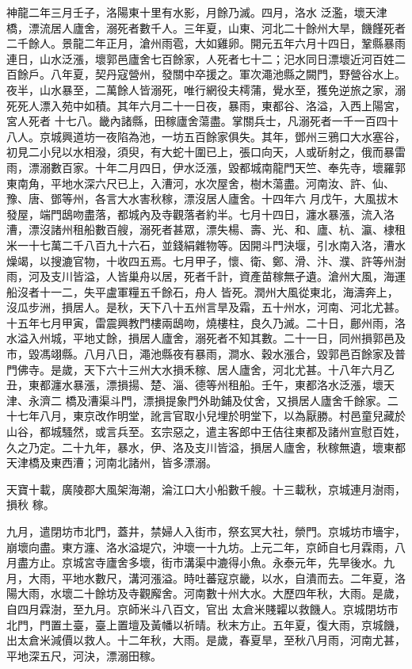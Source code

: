 \begin{pinyinscope}
 神龍二年三月壬子，洛陽東十里有水影，月餘乃滅。四月，洛水
 泛濫，壞天津橋，漂流居人廬舍，溺死者數千人。三年夏，山東、河北二十餘州大旱，饑饉死者二千餘人。景龍二年正月，滄州雨雹，大如雞卵。開元五年六月十四日，鞏縣暴雨連日，山水泛漲，壞郭邑廬舍七百餘家，人死者七十二；汜水同日漂壞近河百姓二百餘戶。八年夏，契丹寇營州，發關中卒援之。軍次澠池縣之闕門，野營谷水上。夜半，山水暴至，二萬餘人皆溺死，唯行網役夫樗蒲，覺水至，獲免逆旅之家，溺死死人漂入苑中如積。其年六月二十一日夜，暴雨，東都谷、洛溢，入西上陽宮，宮人死者
 十七八。畿內諸縣，田稼廬舍蕩盡。掌關兵士，凡溺死者一千一百四十八人。京城興道坊一夜陷為池，一坊五百餘家俱失。其年，鄧州三鴉口大水塞谷，初見二小兒以水相潑，須臾，有大蛇十圍已上，張口向天，人或斫射之，俄而暴雷雨，漂溺數百家。十年二月四日，伊水泛漲，毀都城南龍門天竺、奉先寺，壞羅郭東南角，平地水深六尺已上，入漕河，水次屋舍，樹木蕩盡。河南汝、許、仙、豫、唐、鄧等州，各言大水害秋稼，漂沒居人廬舍。十四年六
 月戊午，大風拔木發屋，端門鴟吻盡落，都城內及寺觀落者約半。七月十四日，瀍水暴漲，流入洛漕，漂沒諸州租船數百艘，溺死者甚眾，漂失楊、壽、光、和、廬、杭、瀛、棣租米一十七萬二千八百九十六石，並錢絹雜物等。因開斗門決堰，引水南入洛，漕水燥竭，以搜漉官物，十收四五焉。七月甲子，懷、衛、鄭、滑、汴、濮、許等州澍雨，河及支川皆溢，人皆巢舟以居，死者千計，資產苗稼無孑遺。滄州大風，海運船沒者十一二，失平盧軍糧五千餘石，舟人
 皆死。潤州大風從東北，海濤奔上，沒瓜步洲，損居人。是秋，天下八十五州言旱及霜，五十州水，河南、河北尤甚。十五年七月甲寅，雷震興教門樓兩鴟吻，燒樓柱，良久乃滅。二十日，鄜州雨，洛水溢入州城，平地丈餘，損居人廬舍，溺死者不知其數。二十一日，同州損郭邑及市，毀馮翊縣。八月八日，澠池縣夜有暴雨，澗水、穀水漲合，毀郭邑百餘家及普門佛寺。是歲，天下六十三州大水損禾稼、居人廬舍，河北尤甚。十八年六月乙丑，東都瀍水暴漲，漂損揚、楚、淄、德等州租船。壬午，東都洛水泛漲，壞天津、永濟二
 橋及漕渠斗門，漂損提象門外助鋪及仗舍，又損居人廬舍千餘家。二十七年八月，東京改作明堂，訛言官取小兒埋於明堂下，以為厭勝。村邑童兒藏於山谷，都城騷然，或言兵至。玄宗惡之，遣主客郎中王佶往東都及諸州宣慰百姓，久之乃定。二十九年，暴水，伊、洛及支川皆溢，損居人廬舍，秋稼無遺，壞東都天津橋及東西漕；河南北諸州，皆多漂溺。



 天寶十載，廣陵郡大風架海潮，淪江口大小船數千艘。十三載秋，京城連月澍雨，損秋
 稼。



 九月，遣閉坊市北門，蓋井，禁婦人入街市，祭玄冥大社，禜門。京城坊市墻宇，崩壞向盡。東方瀍、洛水溢堤穴，沖壞一十九坊。上元二年，京師自七月霖雨，八月盡方止。京城宮寺廬舍多壞，街市溝渠中漉得小魚。永泰元年，先旱後水。九月，大雨，平地水數尺，溝河漲溢。時吐蕃寇京畿，以水，自潰而去。二年夏，洛陽大雨，水壞二十餘坊及寺觀廨舍。河南數十州大水。大歷四年秋，大雨。是歲，自四月霖澍，至九月。京師米斗八百文，官出
 太倉米賤糶以救饑人。京城閉坊市北門，門置土臺，臺上置壇及黃幡以祈晴。秋末方止。五年夏，復大雨，京城饑，出太倉米減價以救人。十二年秋，大雨。是歲，春夏旱，至秋八月雨，河南尤甚，平地深五尺，河決，漂溺田稼。




\end{pinyinscope}
